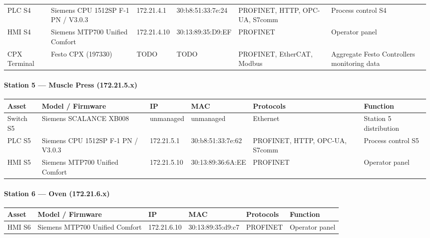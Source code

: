 \documentclass{report}
\begin{document}
{\begin{longtable}{L{2cm} L{2.1cm} L{2.1cm} L{2.6cm} L{2.4cm} L{4cm}}
    PLC S4 & Siemens CPU 1512SP F-1 PN / V3.0.3 & 172.21.4.1 & 30:b8:51:33:7e:24 &
    PROFINET, HTTP, OPC-UA, S7comm & Process control S4 \\

    HMI S4 & Siemens MTP700 Unified Comfort & 172.21.4.10 & 30:13:89:35:D9:EF &
    PROFINET & Operator panel \\

    CPX Terminal & Festo CPX (197330) & TODO & TODO & PROFINET, EtherCAT, Modbus & Aggregate Festo Controllers monitoring data \\
\bottomrule
\end{longtable}

\paragraph{Station 5 --- Muscle Press (172.21.5.x)}
\begin{longtable}{L{2cm} L{2.1cm} L{2.1cm} L{2.6cm} L{2.4cm} L{4cm}}
\toprule
\textbf{Asset} & \textbf{Model / Firmware} & \textbf{IP} & \textbf{MAC} & \textbf{Protocols} & \textbf{Function} \\
\midrule \endhead
    Switch S5 & Siemens SCALANCE XB008 & unmanaged & unmanaged & Ethernet &
    Station 5 distribution \\

    PLC S5 & Siemens CPU 1512SP F-1 PN / V3.0.3 & 172.21.5.1 & 30:b8:51:33:7e:62 &
    PROFINET, HTTP, OPC-UA, S7comm & Process control S5 \\

    HMI S5 & Siemens MTP700 Unified Comfort & 172.21.5.10 & 30:13:89:36:6A:EE &
    PROFINET & Operator panel \\

\bottomrule
\end{longtable}

\pagebreak

\paragraph{Station 6 --- Oven (172.21.6.x)}
\begin{longtable}{L{2cm} L{2.1cm} L{2.1cm} L{2.6cm} L{2.4cm} L{4cm}}
\toprule
\textbf{Asset} & \textbf{Model / Firmware} & \textbf{IP} & \textbf{MAC} & \textbf{Protocols} & \textbf{Function} \\
\midrule \endhead
HMI S6 & Siemens MTP700 Unified Comfort & 172.21.6.10 & 30:13:89:35:d9:c7 & PROFINET & Operator panel \\


\end{longtable}}
\end{document}
